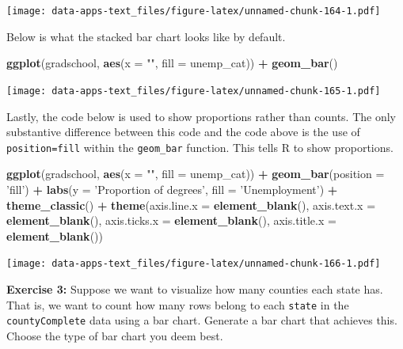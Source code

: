 \documentclass[
]{book}
\newenvironment{Shaded}{\begin{snugshade}}{\end{snugshade}}
\newcommand{\DataTypeTok}[1]{\textcolor[rgb]{0.13,0.29,0.53}{#1}}
\newcommand{\KeywordTok}[1]{\textcolor[rgb]{0.13,0.29,0.53}{\textbf{#1}}}
\newcommand{\NormalTok}[1]{#1}
\newcommand{\OperatorTok}[1]{\textcolor[rgb]{0.81,0.36,0.00}{\textbf{#1}}}
\newcommand{\StringTok}[1]{\textcolor[rgb]{0.31,0.60,0.02}{#1}}
\newenvironment{learncheck}%
{%
  \par\vspace{\baselineskip}\noindent 
  \color{Exercise}\begin{itshape}%
  \par\vspace{\baselineskip}\noindent\ignorespaces 
}%
{%
  \end{itshape}\ignorespacesafterend 
}
\begin{document}
\texttt{[image: data-apps-text\_files/figure-latex/unnamed-chunk-164-1.pdf]}

Below is what the stacked bar chart looks like by default.

\begin{Shaded}
\begin{Highlighting}[]
\KeywordTok{ggplot}\NormalTok{(gradschool, }\KeywordTok{aes}\NormalTok{(}\DataTypeTok{x =} \StringTok{""}\NormalTok{, }\DataTypeTok{fill =}\NormalTok{ unemp_cat)) }\OperatorTok{+}
\StringTok{  }\KeywordTok{geom_bar}\NormalTok{()}
\end{Highlighting}
\end{Shaded}

\texttt{[image: data-apps-text\_files/figure-latex/unnamed-chunk-165-1.pdf]}

Lastly, the code below is used to show proportions rather than counts. The only substantive difference between this code and the code above is the use of \texttt{position=\textquotesingle{}fill\textquotesingle{}} within the \texttt{geom\_bar} function. This tells R to show proportions.

\begin{Shaded}
\begin{Highlighting}[]
\KeywordTok{ggplot}\NormalTok{(gradschool, }\KeywordTok{aes}\NormalTok{(}\DataTypeTok{x =} \StringTok{""}\NormalTok{, }\DataTypeTok{fill =}\NormalTok{ unemp_cat)) }\OperatorTok{+}
\StringTok{  }\KeywordTok{geom_bar}\NormalTok{(}\DataTypeTok{position =} \StringTok{'fill'}\NormalTok{) }\OperatorTok{+}
\StringTok{  }\KeywordTok{labs}\NormalTok{(}\DataTypeTok{y =} \StringTok{'Proportion of degrees'}\NormalTok{,}
       \DataTypeTok{fill =} \StringTok{'Unemployment'}\NormalTok{) }\OperatorTok{+}
\StringTok{  }\KeywordTok{theme_classic}\NormalTok{() }\OperatorTok{+}
\StringTok{  }\KeywordTok{theme}\NormalTok{(}\DataTypeTok{axis.line.x =} \KeywordTok{element_blank}\NormalTok{(),}
        \DataTypeTok{axis.text.x =} \KeywordTok{element_blank}\NormalTok{(),}
        \DataTypeTok{axis.ticks.x =} \KeywordTok{element_blank}\NormalTok{(),}
        \DataTypeTok{axis.title.x =} \KeywordTok{element_blank}\NormalTok{())}
\end{Highlighting}
\end{Shaded}

\texttt{[image: data-apps-text\_files/figure-latex/unnamed-chunk-166-1.pdf]}

\begin{learncheck}
\textbf{Exercise 3:} Suppose we want to visualize how many counties each
state has. That is, we want to count how many rows belong to each
\texttt{state} in the \texttt{countyComplete} data using a bar chart.
Generate a bar chart that achieves this. Choose the type of bar chart
you deem best.
\end{learncheck}
\end{document}
